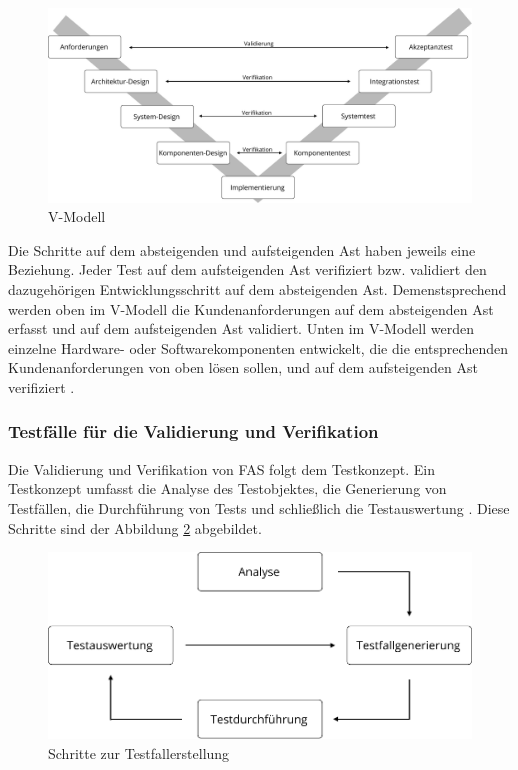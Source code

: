 \begin{figure}[h]
\centering
\includegraphics[scale=0.5]{images/v_modell.pdf}
\caption{V-Modell \cite{hakuli2015virtuelle}}
\label{fig_v_modell}
\end{figure}

Die Schritte auf dem absteigenden und aufsteigenden Ast haben jeweils eine Beziehung. Jeder Test auf dem aufsteigenden Ast verifiziert bzw. validiert den dazugehörigen Entwicklungsschritt auf dem absteigenden Ast. Demenstsprechend werden oben im V-Modell die Kundenanforderungen auf dem absteigenden Ast erfasst und auf dem aufsteigenden Ast validiert. Unten im V-Modell werden einzelne Hardware- oder Softwarekomponenten entwickelt, die die entsprechenden Kundenanforderungen von oben lösen sollen, und auf dem aufsteigenden Ast verifiziert \cite{hakuli2015virtuelle}.


\subsubsection{Testfälle für die Validierung und Verifikation}

Die Validierung und Verifikation von \ac{FAS} folgt dem Testkonzept. Ein Testkonzept umfasst die Analyse des Testobjektes, die Generierung von Testfällen, die Durchführung von Tests und schließlich die Testauswertung \cite{schuldt2013effiziente}. Diese Schritte sind der Abbildung \ref{fig_testfallerstellung} abgebildet.

\begin{figure}[h]
\centering
\includegraphics[scale=0.7]{images/testfallerstellung.pdf}
\caption{Schritte zur Testfallerstellung \cite{schuldt2013effiziente}}
\label{fig_testfallerstellung}
\end{figure}

